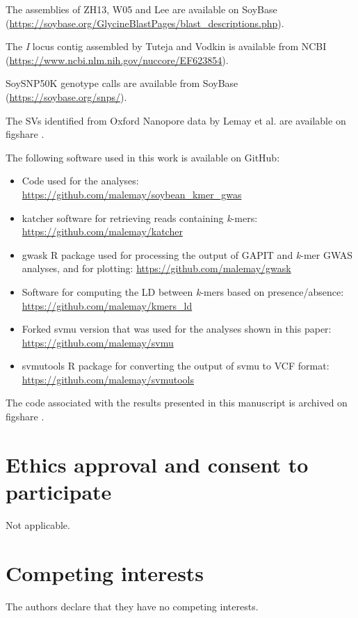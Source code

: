 \documentclass[doublespacing]{bmcart}
\begin{document}
\begin{backmatter}
The assemblies of ZH13, W05 and Lee are available on SoyBase
(\url{https://soybase.org/GlycineBlastPages/blast_descriptions.php}).

The \textit{I} locus contig assembled by Tuteja and Vodkin \cite{tuteja2008} is available from
NCBI (\url{https://www.ncbi.nlm.nih.gov/nuccore/EF623854}).

SoySNP50K genotype calls are available from SoyBase (\url{https://soybase.org/snps/}).

The SVs identified from Oxford Nanopore data by Lemay et al. \cite{lemay2022} are available
on figshare \citep{soybean-sv-figshare}.

The following software used in this work is available on GitHub:

\begin{itemize}
	\item Code used for the analyses:
		\url{https://github.com/malemay/soybean_kmer_gwas}
	\item katcher software for retrieving reads containing \textit{k}-mers:
		\url{https://github.com/malemay/katcher}
	\item gwask R package used for processing the output of GAPIT and
		\textit{k}-mer GWAS analyses, and for plotting:
		\url{https://github.com/malemay/gwask}
	\item Software for computing the LD between \textit{k}-mers
		based on presence/absence: \url{https://github.com/malemay/kmers_ld}
	\item Forked svmu version that was used for the analyses shown in this
		paper: \url{https://github.com/malemay/svmu}
	\item svmutools R package for converting the output of svmu to VCF
		format: \url{https://github.com/malemay/svmutools}
\end{itemize}

The code associated with the results presented in this manuscript is archived
on figshare \citep{kmer-gwas-code}.

\section*{Ethics approval and consent to participate}%
Not applicable.

\section*{Competing interests}
The authors declare that they have no competing interests.


\end{backmatter}
\end{document}
